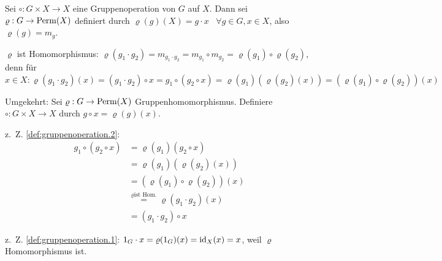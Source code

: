 \begin{beweis}
    \item Sei $\circ: G \times X \rightarrow X$ eine Gruppenoperation von $G$
          auf $X$. Dann sei $\varrho: G \rightarrow \operatorname{Perm}(X)$ definiert
          durch $\varrho(g)(X) = g \cdot x \;\;\; \forall g \in G, x \in X$,
          also $\varrho(g) = m_g$.

          $\varrho$ ist Homomorphismus: $\varrho(g_1 \cdot g_2) = m_{g_1 \cdot g_2} = m_{g_1} \circ m_{g_2} = \varrho(g_1) \circ \varrho(g_2)$,
          denn für $x \in X: \varrho(g_1 \cdot g_2) (x) = (g_1 \cdot g_2) \circ x = g_1 \circ (g_2 \circ x) = \varrho(g_1) (\varrho(g_2)(x)) = (\varrho(g_1) \circ \varrho (g_2)) (x)$

          Umgekehrt: Sei $\varrho: G \rightarrow \operatorname{Perm}(X)$ Gruppenhomomorphismus. Definiere $\circ: G \times X \rightarrow X$ durch $g \circ x = \varrho (g)(x)$.

          z.~Z. \cref{def:gruppenoperation.2}: 
          \begin{align*}
            g_1 \circ (g_2 \circ x) &= \varrho (g_1) (g_2 \circ x)\\
            &= \varrho(g_1) (\varrho(g_2)(x))\\
            &= (\varrho(g_1) \circ \varrho(g_2))(x)\\
            &\overset{\varrho \text {ist Hom.}}{=} \varrho(g_1 \cdot g_2) (x)\\
            &= (g_1 \cdot g_2) \circ x
          \end{align*}

            z.~Z. \cref{def:gruppenoperation.1}: 
            $1_G \cdot x = \varrho(1_G)(x) = \textnormal{id}_X(x) = x$, weil $\varrho$ Homomorphismus ist.
\end{beweis}

